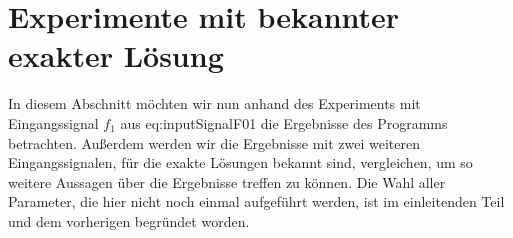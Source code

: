 
\section{Experimente mit bekannter exakter Lösung}
\label{sec:experimentsWithExactSolution}

In diesem Abschnitt möchten wir nun anhand des Experiments mit Eingangssignal
$f_1$ aus eq:inputSignalF01 die Ergebnisse des Programms betrachten.
Außerdem werden wir die Ergebnisse mit zwei weiteren Eingangssignalen,
für die exakte Lösungen bekannt sind, vergleichen, um so weitere Aussagen
über die Ergebnisse treffen zu können.
Die Wahl aller Parameter, die hier nicht noch einmal aufgeführt werden, ist
im einleitenden Teil und dem vorherigen  
begründet worden.

